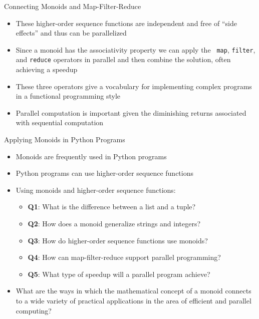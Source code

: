 \documentclass[14pt,aspectratio=169]{beamer}
\begin{document}
%
\begin{frame}{Connecting Monoids and Map-Filter-Reduce}
  \begin{itemize}
    \item These higher-order sequence functions are independent and free of
      ``side effects'' and thus can be parallelized
      \vspace*{-.15in}
    \item Since a monoid has the associativity property we can apply the {\tt
      map}, {\tt filter}, and {\tt reduce} operators in parallel and then
      combine the solution, often achieving a speedup
      \vspace*{-.15in}
    \item These three operators give a vocabulary for implementing complex
      programs in a functional programming style
      \vspace*{-.15in}
    \item Parallel computation is important given the diminishing
      returns associated with sequential computation
  \end{itemize}
\end{frame}

%
\begin{frame}{Applying Monoids in Python Programs}
  \begin{itemize}
    \item Monoids are frequently used in Python programs
      \vspace*{-.2in}
    \item Python programs can use higher-order sequence functions
      \vspace*{-.2in}
    \item Using monoids and higher-order sequence functions:
      \begin{itemize}
        \item {\bf Q1}: What is the difference between a list and a tuple?
        \item {\bf Q2}: How does a monoid generalize strings and integers?
        \item {\bf Q3}: How do higher-order sequence functions use monoids?
        \item {\bf Q4}: How can map-filter-reduce support parallel programming?
        \item {\bf Q5}: What type of speedup will a parallel program achieve?
      \end{itemize}
      \vspace*{-.2in}
    \item What are the ways in which the mathematical concept of a monoid
      connects to a wide variety of practical applications in the area of
      efficient and parallel computing?
  \end{itemize}
\end{frame}
\end{document}
